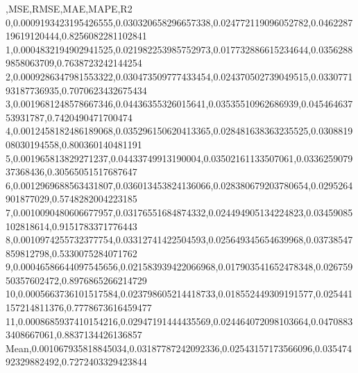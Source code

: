 ,MSE,RMSE,MAE,MAPE,R2
0,0.0009193423195426555,0.030320658296657338,0.024772119096052782,0.046228719619120444,0.8256082281102841
1,0.0004832194902941525,0.021982253985752973,0.017732886615234644,0.03562889858063709,0.7638723242144254
2,0.0009286347981553322,0.030473509777433454,0.024370502739049515,0.033077193187736935,0.7070623432675434
3,0.0019681248578667346,0.04436355326015641,0.03535510962686939,0.04546463753931787,0.7420490471700474
4,0.0012458182486189068,0.035296150620413365,0.028481638363235525,0.030881908030194558,0.800360140481191
5,0.001965813829271237,0.04433749913190004,0.03502161133507061,0.033625907937368436,0.30565051517687647
6,0.0012969688563431807,0.036013453824136066,0.028380679203780654,0.0295264901877029,0.5748282004223185
7,0.0010090480606677957,0.03176551684874332,0.024494905134224823,0.03459085102818614,0.9151783371776443
8,0.0010974255732377754,0.03312741422504593,0.025649345654639968,0.03738547859812798,0.5330075284071762
9,0.00046586644097545656,0.021583939422066968,0.017903541652478348,0.02675950357602472,0.8976865266214729
10,0.0005663736101517584,0.023798605214418733,0.018552449309191577,0.025441157214811376,0.7778673616459477
11,0.0008685937410154216,0.02947191444435569,0.024464072098103664,0.04708833408667061,0.8837134426136857
Mean,0.001067935818845034,0.03187787242092336,0.02543157173566096,0.03547492329882492,0.7272403329423844
